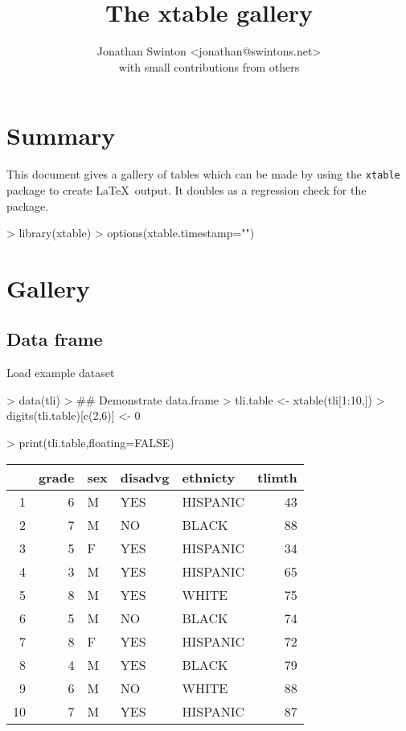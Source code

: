 \documentclass[letterpaper]{article}
\title{
The xtable gallery
}
\author{Jonathan Swinton <jonathan@swintons.net>\\ with small contributions from others}
\begin{document}


\maketitle
\section{Summary}
This document gives a gallery of tables which can be made
by using the {\tt xtable} package to create \LaTeX\ output.
It doubles as a regression check for the package.

\begin{Schunk}
\begin{Sinput}
> library(xtable)
> options(xtable.timestamp="")
\end{Sinput}
\end{Schunk}

\section{Gallery}
\subsection{Data frame}
Load example dataset
\begin{Schunk}
\begin{Sinput}
> data(tli)
> ## Demonstrate data.frame
> tli.table <- xtable(tli[1:10,])
> digits(tli.table)[c(2,6)] <- 0
\end{Sinput}
\end{Schunk}
\begin{Schunk}
\begin{Sinput}
> print(tli.table,floating=FALSE)
\end{Sinput}
% latex table generated in R 3.1.1 by xtable 1.7-3 package
% 
\begin{tabular}{rrlllr}
  \hline
 & grade & sex & disadvg & ethnicty & tlimth \\ 
  \hline
1 & 6 & M & YES & HISPANIC & 43 \\ 
  2 & 7 & M & NO & BLACK & 88 \\ 
  3 & 5 & F & YES & HISPANIC & 34 \\ 
  4 & 3 & M & YES & HISPANIC & 65 \\ 
  5 & 8 & M & YES & WHITE & 75 \\ 
  6 & 5 & M & NO & BLACK & 74 \\ 
  7 & 8 & F & YES & HISPANIC & 72 \\ 
  8 & 4 & M & YES & BLACK & 79 \\ 
  9 & 6 & M & NO & WHITE & 88 \\ 
  10 & 7 & M & YES & HISPANIC & 87 \\ 
   \hline
\end{tabular}\end{Schunk}
\end{document}

